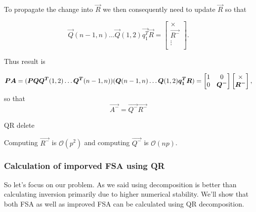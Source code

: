 To propagate the change into $\vec{R}$ we then consequently need to update $\vec{R}$ so that

\begin{equation}
	\vec{Q}(n-1,n) \ldots \vec{Q}(1,2)\vec{q_1^T} \vec{R} = 	\begin{bmatrix}
		\times \\
		\vec{R^{-}}\\
		\vdots \\
	\end{bmatrix}.
\end{equation}

Thus result is

\begin{equation}
	\vec{P}\vec{A} = (\vec{P}\vec{Q}  \vec{Q^T}(1,2) \ldots   \vec{Q^T}(n-1,n)) (\vec{Q}(n-1,n) \ldots \vec{Q}(1,2)\vec{q_1^T} \vec{R} ) \\
	= 
	\begin{bmatrix}
		1 & 0 \\
		0 & \vec{Q^{-}}
	\end{bmatrix}
	\begin{bmatrix}
		\times \\
		\vec{R^{-}}
	\end{bmatrix},
\end{equation}
so that 
\begin{equation}
	\vec{A^{-}} = \vec{Q^{-}}\vec{R^{-}}
\end{equation}

\begin{algorithm}[H]
	\label{removingrow}
	  \caption{QR delete}

	\;
\end{algorithm}

Computing $\vec{R^{-}}$ is $\mathcal{O}(p^2)$ and computing $\vec{Q^{-}}$ is $\mathcal{O}(np)$.



\subsubsection{Calculation of imporved FSA using QR}
So let's focus on our problem. As we said using decomposition is better than calculating inversion primarily due to higher numerical stability. 
We'll show that both FSA as well as improved FSA can be calculated using QR decomposition.

